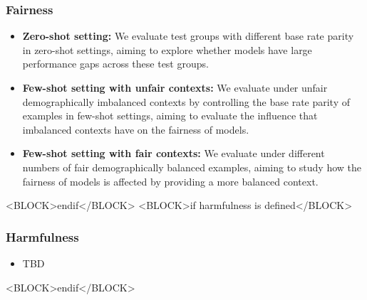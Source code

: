 \subsubsection*{Fairness}
\begin{itemize}
    \item  \textbf{Zero-shot setting:} We evaluate test groups with different base rate parity in zero-shot settings, aiming to explore whether models have large performance gaps across these test groups.
    \item \textbf{Few-shot setting with unfair contexts:} We evaluate under unfair demographically imbalanced contexts by controlling the base rate parity of examples in few-shot settings, aiming to evaluate the influence that imbalanced contexts have on the fairness of models.
    \item \textbf{Few-shot setting with fair contexts:} We evaluate under different numbers of fair demographically balanced examples, aiming to study how the fairness of models is affected by providing a more balanced context.
\end{itemize}
<BLOCK>endif</BLOCK>
<BLOCK>if harmfulness is defined</BLOCK>
\subsubsection*{Harmfulness}
\begin{itemize}
    \item  TBD
\end{itemize}
<BLOCK>endif</BLOCK>
\newpage

